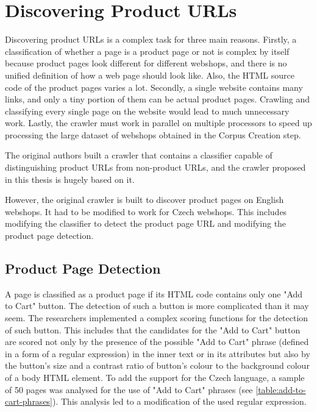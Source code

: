 \section{Discovering Product URLs}
    Discovering product URLs is a complex task for three main reasons. Firstly, a classification of whether a page is a product page or not is complex by itself because product pages look different for different webshops, and there is no unified definition of how a web page should look like. Also, the HTML source code of the product pages varies a lot.
    Secondly, a single website contains many links, and only a tiny portion of them can be actual product pages. Crawling and classifying every single page on the website would lead to much unnecessary work.
    Lastly, the crawler must work in parallel on multiple processors to speed up processing the large dataset of webshops obtained in the Corpus Creation step.

    The original authors built a crawler that contains a classifier capable of distinguishing product URLs from non-product URLs, and the crawler proposed in this thesis is hugely based on it.

    However, the original crawler is built to discover product pages on English webshops. It had to be modified to work for Czech webshops. This includes modifying the classifier to detect the product page URL and modifying the product page detection.

    \subsection{Product Page Detection}
    \label{section:product-page-detection}

    A page is classified as a product page if its HTML code contains only one "Add to Cart" button. The detection of such a button is more complicated than it may seem. The researchers implemented a complex scoring functions for the detection of such button. This includes that the candidates for the "Add to Cart" button are scored not only by the presence of the possible "Add to Cart" phrase (defined in a form of a regular expression) in the inner text or in its attributes but also by the button's size and a contrast ratio of button's colour to the background colour of a body HTML element. To add the support for the Czech language, a sample of 50 pages was analysed for the use of "Add to Cart" phrases (see \ref{table:add-to-cart-phrases}). This analysis led to a modification of the used regular expression.

